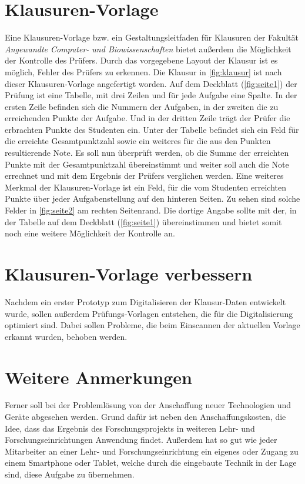 \documentclass[notables, nomenclature, oneside, 150]{HSMW-Thesis}
\begin{document}
	\section{Klausuren-Vorlage}\label{sc:klausuren-vorlage}
	Eine Klausuren-Vorlage bzw. ein Gestaltungsleitfaden für Klausuren der Fakultät \textit{Angewandte Computer- und Biowissenschaften} bietet außerdem die Möglichkeit der Kontrolle des Prüfers. Durch das vorgegebene Layout der Klausur ist es möglich, Fehler des Prüfers zu erkennen. Die Klausur in \autoref{fig:klausur} ist nach dieser Klausuren-Vorlage angefertigt worden. Auf dem Deckblatt (\ref{fig:seite1}) der Prüfung ist eine Tabelle, mit drei Zeilen und für jede Aufgabe eine Spalte. In der ersten Zeile befinden sich die Nummern der Aufgaben, in der zweiten die zu erreichenden Punkte der Aufgabe. Und in der dritten Zeile trägt der Prüfer die erbrachten Punkte des Studenten ein. Unter der Tabelle befindet sich ein Feld für die erreichte Gesamtpunktzahl sowie ein weiteres für die aus den Punkten resultierende Note. Es soll nun überprüft werden, ob die Summe der erreichten Punkte mit der Gesamtpunktzahl übereinstimmt und weiter soll auch die Note errechnet und mit dem Ergebnis der Prüfers verglichen werden. Eine weiteres Merkmal der Klausuren-Vorlage ist ein Feld, für die vom Studenten erreichten Punkte über jeder Aufgabenstellung auf den hinteren Seiten. Zu sehen sind solche Felder in \autoref{fig:seite2} am rechten Seitenrand. Die dortige Angabe sollte mit der, in der Tabelle auf dem Deckblatt (\ref{fig:seite1}) übereinstimmen und bietet somit noch eine weitere Möglichkeit der Kontrolle an.
	
	\section{Klausuren-Vorlage verbessern}
	Nachdem ein erster Prototyp zum Digitalisieren der Klausur-Daten entwickelt wurde, sollen außerdem Prüfungs-Vorlagen entstehen, die für die Digitalisierung optimiert sind. Dabei sollen Probleme, die beim Einscannen der aktuellen Vorlage erkannt wurden, behoben werden. 
	
	\section{Weitere Anmerkungen}
	Ferner soll bei der Problemlösung von der Anschaffung neuer Technologien und Geräte abgesehen werden. Grund dafür ist neben den Anschaffungskosten, die Idee, dass das Ergebnis des Forschungsprojekts in weiteren Lehr- und Forschungseinrichtungen Anwendung findet. Außerdem hat so gut wie jeder Mitarbeiter an einer Lehr- und Forschungseinrichtung ein eigenes oder Zugang zu einem Smartphone oder Tablet, welche durch die eingebaute Technik in der Lage sind, diese Aufgabe zu übernehmen. 
\end{document}
